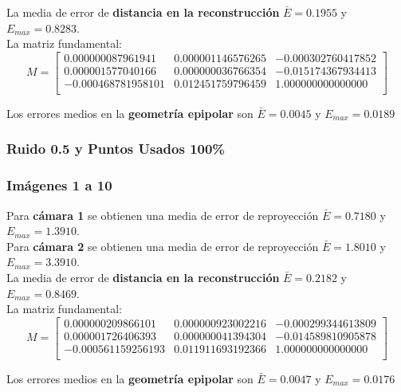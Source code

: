 \documentclass[a4paper, fontsize=11pt]{scrartcl} %
\numberwithin{equation}{section} %
\numberwithin{figure}{section} %
\numberwithin{table}{section} %
\begin{document}
	La media de error de \textbf{distancia en la reconstrucción} $\bar{E} = 0.1955$ y $E_{max} = 0.8283$.\\
	La matriz fundamental:
	\[
	M=
	\begin{bmatrix}
	0.000000087961941&	0.000001146576265&	-0.000302760417852 \\
	0.000001577040166&	0.000000036766354&	-0.015174367934413 \\
	-0.000468781958101&	0.012451759796459&	1.000000000000000  \\
	
	\end{bmatrix}
	\]
	
	Los errores medios en la \textbf{geometría epipolar} son $\bar{E} =  0.0045$ y $E_{max} = 0.0189$
	
	
	\subsubsection{Ruido 0.5 y Puntos Usados 100\%}
	
	\subsubsection*{Imágenes 1 a 10}
	
	Para \textbf{cámara 1} se obtienen una media de error de reproyección $\bar{E} = 0.7180$ y $E_{max} = 1.3910$.\\
	Para \textbf{cámara 2} se obtienen una media de error de reproyección $\bar{E} = 1.8010$ y $E_{max} = 3.3910$.\\
	
	La media de error de \textbf{distancia en la reconstrucción} $\bar{E} = 0.2182$ y $E_{max} = 0.8469$.\\
	La matriz fundamental:
	\[
	M=
	\begin{bmatrix}
	0.000000209866101&	0.000000923002216&	-0.000299344613809 \\
	0.000001726406393&	0.000000041394304&	-0.014589810905878 \\
	-0.000561159256193&	0.011911693192366&	1.000000000000000  \\
	
	\end{bmatrix}
	\]
	
	Los errores medios en la \textbf{geometría epipolar} son $\bar{E} = 0.0047$ y $E_{max} = 0.0176$
	
\end{document}
